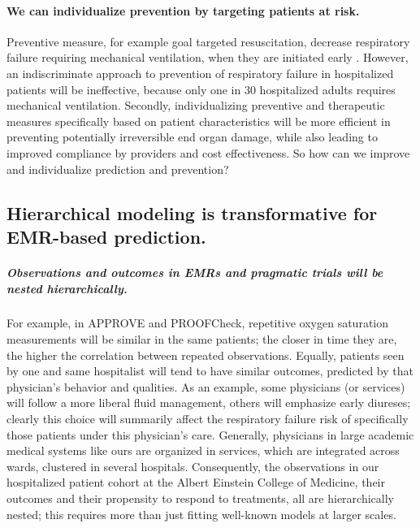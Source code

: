 \documentclass[11pt,notitlepage]{article}
\begin{document}
\paragraph*{We can individualize prevention by targeting patients at risk.}
Preventive measure, for example goal targeted resuscitation, decrease respiratory failure requiring mechanical ventilation, when they are initiated early \cite{Rivers_12594312}. However, an indiscriminate approach to prevention of respiratory failure in hospitalized patients will be ineffective, because only one in 30 hospitalized adults requires mechanical ventilation. Secondly, individualizing preventive and therapeutic measures specifically based on patient characteristics will be more efficient in preventing potentially irreversible end organ damage, while also  leading to improved compliance by providers and cost effectiveness. So how can we improve and individualize prediction and prevention? 

\subsection*{Hierarchical modeling is transformative for EMR-based prediction.}

\subparagraph{Observations and outcomes in EMRs and pragmatic trials will be nested hierarchically.}
For example, in APPROVE and PROOFCheck, repetitive oxygen saturation measurements will be similar in the same patients; the closer in time they are, the higher the correlation between repeated observations. Equally, patients seen by one and same hospitalist will tend to have similar outcomes, predicted by that physician's behavior and qualities. As an example, some physicians (or services) will follow a more liberal fluid management, others will emphasize early diureses; clearly this choice will summarily affect the respiratory failure risk of specifically those patients under this physician's care. Generally, physicians in large academic medical systems like ours are organized in services, which are integrated across wards, clustered in several hospitals. Consequently, the observations in our hospitalized patient cohort at the Albert Einstein College of Medicine, their outcomes and their propensity to respond to treatments, all are hierarchically nested; this requires more than just fitting well-known models at larger scales. 
\end{document}
